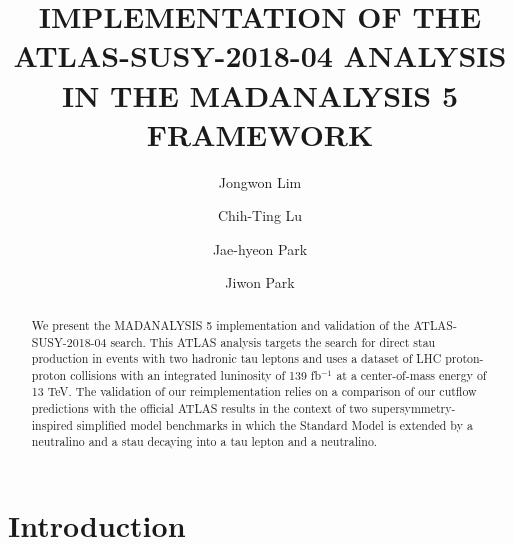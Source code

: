 \documentclass{ws-mpla}
\begin{document}

\catchline{}{}{}{}{}

\title{IMPLEMENTATION OF THE ATLAS-SUSY-2018-04 ANALYSIS IN THE MADANALYSIS 5 FRAMEWORK}

\author{\footnotesize Jongwon Lim}
\address{
  Department of Physics, Hanyang University, Seoul 04763, Republic of Korea}

\author{\footnotesize Chih-Ting Lu}
\address{
  School of Physics, KIAS, Seoul 02455, Republic of Korea}

\author{\footnotesize Jae-hyeon Park}
\address{
  School of Physics, KIAS, Seoul 02455, Republic of Korea}

\author{\footnotesize Jiwon Park}
\address{
  Department of Physics, Hanyang University, Seoul 04763, Republic of Korea}
\maketitle


\begin{abstract}
We present the MADANALYSIS 5 implementation and validation of the ATLAS-SUSY-2018-04 search.
This ATLAS analysis targets the search for direct stau production in events with two hadronic tau leptons and {\color{blue}uses a dataset of LHC proton-proton collisions with an integrated luninosity of 139 fb$^{-1}$} at a center-of-mass energy of 13 TeV.
The validation of our reimplementation relies on a comparison of our cutflow predictions with the official ATLAS results in the context of two supersymmetry-inspired simplified {\color{blue}model benchmarks} in which the Standard Model is extended by a neutralino and a stau decaying into a tau lepton and a neutralino.
\end{abstract}


\section{Introduction}
\end{document}

